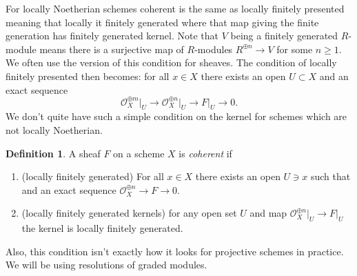 \documentclass[12pt]{article}
\numberwithin{equation}{section}
\theoremstyle{definition}
\newtheorem{definition}[theorem]{Definition}
\theoremstyle{remark}
\newcommand{\Ocal}{\mathcal{O}}
\begin{document}
For locally Noetherian schemes coherent is the same as locally finitely presented meaning that locally it finitely generated where that map giving the finite generation has finitely generated kernel.
Note that $V$ being a finitely generated $R$-module means there is a surjective map of $R$-modules $R^{\oplus n}\to V$ for some $n\geq 1$. 
We often use the version of this condition for sheaves. 
The condition of locally finitely presented then becomes: for all $x\in X$ there exists an open $U\subset X$ and an exact sequence 
 $$ \Ocal_X^{\oplus m}\vert_U \to \Ocal_X^{\oplus n}\vert_U \to F\vert_U \to 0. $$
We don't quite have such a simple condition on the kernel for schemes which are not locally Noetherian. 
\begin{definition}
A sheaf $F$ on a scheme $X$ is \emph{coherent} if 
\begin{enumerate}
	\item (locally finitely generated) For all $x\in X$ there exists an open $U\owns x$ such that and an exact sequence $\Ocal_X^{\oplus n} \to F \to 0$.
	\item (locally finitely generated kernels) for any open set $U$ and map $\Ocal_X^{\oplus n}\vert_U \to F\vert_U$ the kernel is locally finitely generated.
\end{enumerate}
\end{definition}
Also, this condition isn't exactly how it looks for projective schemes in practice.
We will be using resolutions of graded modules. 
\end{document}
